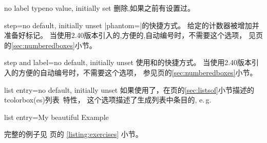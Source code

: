   \begin{docTcbKey}{no label type}{}{no value, initially set}
  删除,如果之前有设置过。
  \end{docTcbKey}
  
  \begin{docTcbKey}{step}{=}{no default, initially unset}
  |phantom={}|的快捷方式。%
  给定的计数器被增加并准备好标记。%
  当使用2.40版本引入的,方便的,自动编号时，不需要这个选项，%
  见\pageref{sec:numberedboxes}页的\ref{sec:numberedboxes}小节。
  \end{docTcbKey}



\begin{docTcbKey}{step and label}{=}{no default, initially unset}
  使用和的快捷方式。%
  当使用2.40版本引入的方便的自动编号时，不需要这个选项，%
  参见\pageref{sec:numberedboxes}页的\ref{sec:numberedboxes}小节。
  \end{docTcbKey}
  

\begin{docTcbKey}{list entry}{=}{no default, initially unset}
  如果使用了，在\pageref{sec:listsof}页的\ref{sec:listsof}小节描述的 \flqq tcolorbox(es)列表\frqq\ 特性， 
  这个选项描述了生成列表中条目的, e.\,g.
  \begin{dispListing}
  list entry={\protect\numberline{\thetcbcounter}My beautiful Example}
  \end{dispListing}
  完整的例子见 \pageref{listing:exercises} 页的 \ref{listing:exercises} 小节。
  \end{docTcbKey}

